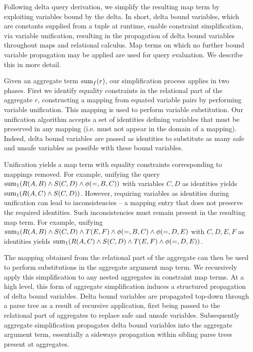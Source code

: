 Following delta query derivation, we simplify the resulting map term by
exploiting variables bound by the delta. In short, delta bound variables, which
are constants supplied from a tuple at runtime, enable constraint
simplification, via variable unification, resulting in the propagation of delta
bound variables throughout maps and relational calculus. Map terms on which no
further bound variable propagation may be applied are used for query
evaluation. We describe this in more detail.

Given an aggregate term $\mathrm{sum}_{f}(r)$, our simplification process applies in
two phases. First we identify equality constraints in the relational part of the
aggregate $r$, constructing a mapping from equated variable pairs by performing
variable unification. This mapping is used to perform variable substitution. Our
unification algorithm accepts a set of identities defining variables that must
be preserved in any mapping (i.e. must not appear in the domain of a
mapping). Indeed, delta bound variables are passed as identities to substitute
as many safe and unsafe variables as possible with these bound
variables.

Unification yields a map term with equality constraints corresponding
to mappings removed. 
For example, unifying the query
$\mathrm{sum}_{1}(R(A,B) \wedge S(C,D) \wedge \phi(=,B,C))$
with variables $C,D$ as identities yields $\mathrm{sum}_{1}(R(A,C) \wedge S(C,D))$.
However, requiring variables as identities during
unification can lead to inconsistencies -- a mapping entry that does not
preserve the required identities. Such inconsistencies must remain present in
the resulting map term.
For example, unifying
$\mathrm{sum}_{1}(R(A,B) \wedge S(C,D) \wedge T(E,F) \wedge \phi(=,B,C) \wedge
\phi(=,D,E)$ with $C,D,E,F$ as identities yields
 $\mathrm{sum}_{1}(R(A,C) \wedge S(C,D) \wedge T(E,F) \wedge \phi(=,D,E))$.

The mapping obtained from the relational part of the aggregate can then be used
to perform substitutions in the aggregate argument map term. We recursively
apply this simplification to any nested aggregates in constraint map terms.
At a high level, this form of aggregate simplification induces a structured
propagation of delta bound variables. Delta bound variables are propagated
top-down through a parse tree as a result of recursive application, first being
passed to the relational part of aggregates to replace safe and unsafe
variables. Subsequently aggregate simplification propagates delta bound
variables into the aggregate argument term, essentially a sideways propagation
within sibling parse trees present at aggregates.

